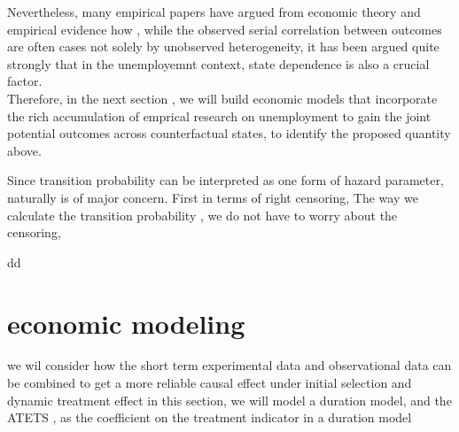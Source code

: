 \documentclass{article}
\begin{document}
Nevertheless, many empirical papers\cite{heckman1981heterogeneity,heckman1984method, torgovitsky2019nonparametric} have argued from economic theory and empirical evidence how , while the observed serial correlation between outcomes are often cases not solely by unobserved heterogeneity, it has been argued quite strongly that in the unemployemnt context, state dependence is also a crucial factor. 
\\ Therefore, in the next section , we will build economic models that incorporate the rich accumulation of emprical research on unemployment  to gain the joint potential outcomes across counterfactual states, to identify the proposed quantity above.



\koko

\begin{remark}
\koko 
Since transition probability can be interpreted as one form of hazard parameter, naturally is of major concern. First in terms of right censoring, 
The way we calculate the transition probability , we do not have to worry about the censoring, 
\end{remark}
\begin{theorem}
dd
\end{theorem}


\section{economic modeling}
 we wil consider how the short term experimental data and observational data can be combined to get a more reliable causal effect under initial selection and dynamic treatment effect
 in this section, we will model a duration model, and the ATETS , as the coefficient on the treatment indicator in a duration model
 
\end{document}
